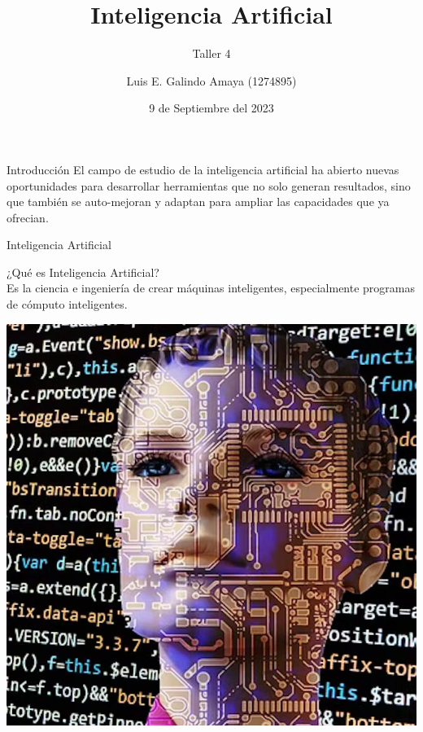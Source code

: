 \documentclass[aspectratio=169, 9pt]{beamer}
\author{Luis E. Galindo Amaya (1274895)}
\date{9 de Septiembre del 2023}
\title{Inteligencia Artificial}
\subtitle{Taller 4}
\begin{document}
\maketitle

\begin{frame}[label={sec:orgd170ace}]{Introducción}
El campo de estudio de la inteligencia artificial ha abierto nuevas 
oportunidades para desarrollar herramientas que no solo generan resultados, 
sino que también se auto-mejoran y adaptan para ampliar las capacidades que
ya ofrecian.
\end{frame}

\begin{frame}[label={sec:orgcd3bd98}]{Inteligencia Artificial}
\begin{twoc}
\alert{¿Qué es Inteligencia Artificial?} \\
\autocite{Jones_2009} Es la ciencia e ingeniería de crear máquinas 
inteligentes, especialmente programas de cómputo inteligentes.
\end{twoc}
\begin{threec}
\begin{center}
\includegraphics[width=.9\linewidth]{images/ib.jpg}
\end{center}
\end{threec}
\end{frame}
\end{document}
